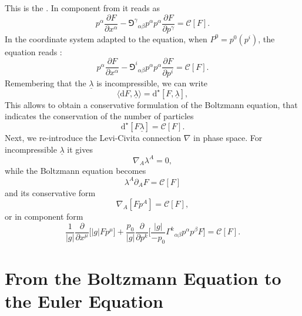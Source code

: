%
This is the . 
In component from it reads as 
%
\begin{equation}
p^{\alpha}\frac{\partial F}{\partial x^{\alpha}} - {\Game^{\gamma}}_{\alpha\beta}p^{\alpha}p^{\alpha}\frac{\partial F}{\partial p^{\gamma}} =\mathcal{C}[F].
\end{equation}
%
In the coordinate system adapted to the equation, when $P^0 = p^0(p^i)$, the equation reads \citep{Cercignani:2002}:
%
\begin{equation}
p^{\alpha}\frac{\partial F}{\partial x^{\alpha}} - {\Game^{i}}_{\alpha\beta}p^{\alpha}p^{\alpha}\frac{\partial F}{\partial p^{i}} =\mathcal{C}[F].
\end{equation}
%
Remembering that the $\underline{\lambda}$ is incompressible, we can write
%
\begin{equation}
\langle\text{d}F,\underline{\lambda}\rangle = \text{d}^{\star}[F,\underline{\lambda}],
\end{equation}
%
This allows to obtain a conservative formulation of the Boltzmann equation, 
that indicates the conservation of the number of particles \citep{Cardall:2002bp}
%
\begin{equation}
\text{d}^{\star}[F\underline{\lambda}] = \mathcal{C}[F].
\end{equation}
%
Next, we re-introduce the Levi-Civita connection $\nabla$ in phase space.
 For incompressible $\underline{\lambda}$ it gives
%
\begin{equation}
\nabla_A\lambda^A=0,
\end{equation}
%
while the Boltzmann equation becomes 
%
\begin{equation}
\lambda^A\partial_A F=\mathcal{C}[F]
\end{equation}
%
and its conservative form 
%
\begin{equation}
\nabla_A[Fp^{A}] = \mathcal{C}[F],
\label{eq:theory:liouvilletheorem}
\end{equation}
%
or in component form
%
\begin{equation}
\frac{1}{|g|}\frac{\partial}{\partial x^{\mu}}\Bigg[|g|Fp^{\mu}\Bigg] + \frac{p_0}{|g|}\frac{\partial}{\partial p^{k}}\Bigg[\frac{|g|}{-p_0}{\Gamma^k}_{\alpha\beta}p^{\alpha}p^{\beta}F\Bigg] = \mathcal{C}[F].
\end{equation}




\section{From the Boltzmann Equation to the Euler Equation}


